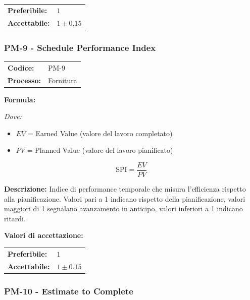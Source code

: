 \documentclass[a4paper,11pt,oneside]{scrartcl}
\begin{document}
\noindent
\begin{tabular}{@{}ll@{}}
\textbf{Preferibile:} & $1$ \\
\textbf{Accettabile:} & $1 \pm 0.15$ \\
\end{tabular}

\subsubsection{PM-9 - Schedule Performance Index}

\noindent
\begin{tabular}{@{}p{}p{}@{}}
\textbf{Codice:} & PM-9 \\
\textbf{Processo:} & Fornitura \\
\end{tabular}

\vspace{0.3cm}
\noindent\textbf{Formula:}

\noindent\textit{Dove:}
\begin{itemize}[leftmargin=1.5cm, topsep=0pt, itemsep=0pt]
    \item $EV$ = Earned Value (valore del lavoro completato)
    \item $PV$ = Planned Value (valore del lavoro pianificato)
\end{itemize}

\[
\text{SPI} = \frac{EV}{PV}
\]

\noindent\textbf{Descrizione:} Indice di performance temporale che misura l'efficienza rispetto alla pianificazione. Valori pari a 1 indicano rispetto della pianificazione, valori maggiori di 1 segnalano avanzamento in anticipo, valori inferiori a 1 indicano ritardi.

\vspace{0.2cm}
\noindent\textbf{Valori di accettazione:}
\vspace{0.1cm}

\noindent
\begin{tabular}{@{}ll@{}}
\textbf{Preferibile:} & $1$ \\
\textbf{Accettabile:} & $1 \pm 0.15$ \\
\end{tabular}

\subsubsection{PM-10 - Estimate to Complete}
\end{document}
